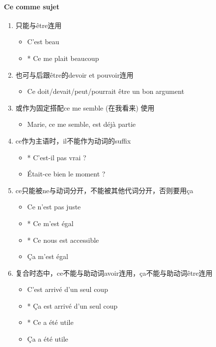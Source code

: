 \documentclass[UTF8]{report}
\begin{document}
\paragraph{Ce comme sujet}

\begin{enumerate}
    \item 只能与être连用
    \begin{itemize}
        \item C’est beau
        \item * Ce me plait beaucoup
    \end{itemize}
    \item 也可与后跟être的devoir et pouvoir连用
    \begin{itemize}
        \item Ce doit/devait/peut/pourrait être un bon argument
    \end{itemize}
    \item 或作为固定搭配ce me semble (在我看来) 使用
    \begin{itemize}
        \item Marie, ce me semble, est déjà partie
    \end{itemize}
    \item ce作为主语时，il不能作为动词的suffix
    \begin{itemize}
        \item * C’est-il pas vrai ?
        \item Était-ce bien le moment ?
    \end{itemize}
    \item ce只能被ne与动词分开，不能被其他代词分开，否则要用ça
    \begin{itemize}
        \item Ce n’est pas juste
        \item * Ce m’est égal
        \item * Ce nous est accessible
        \item Ça m’est égal
    \end{itemize}
    \item 复合时态中，ce不能与助动词avoir连用，ça不能与助动词être连用
    \begin{itemize}
        \item C’est arrivé d’un seul coup
        \item * Ça est arrivé d’un seul coup
        \item * Ce a été utile
        \item Ça a été utile
    \end{itemize}

\end{enumerate}
\end{document}
